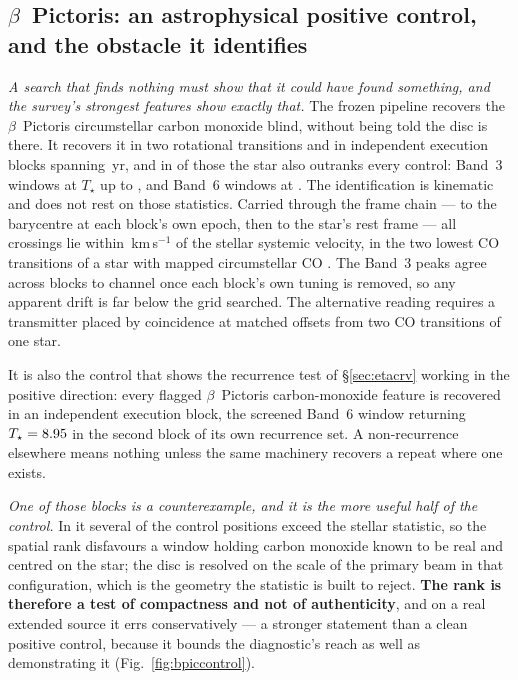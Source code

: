 \subsection{$\beta$~Pictoris: an astrophysical positive control, and the
obstacle it identifies} \label{sec:bpicval}

\emph{A search that finds nothing must show that it could have found
something, and the survey's strongest features show exactly that.} The
frozen pipeline recovers the $\beta$~Pictoris circumstellar carbon monoxide
blind, without being told the disc is there. It recovers it in two
rotational transitions and in \CsBpCoBlocks{} independent execution
blocks spanning \BpBaselineYr\,yr, and in \NStageOneBpicEb{} of those the
star also outranks every control: \BpicNFlagThree{} Band~3 windows at
$T_\star$ up to \BpicBThreeTsym, and \BpicNFlagSix{} Band~6 windows at
\BpicBSixTsym. The identification is kinematic and does not rest on those
statistics. Carried through the frame chain --- to the barycentre at each
block's own epoch, then to the star's rest frame --- all \BpicPanelNCo{}
crossings lie within \BpicDvCoHi\,km\,s$^{-1}$ of the stellar systemic
velocity, in the two lowest CO transitions of a star with mapped
circumstellar CO \citep{Dent2014,Matra2017}. The Band~3 peaks agree across blocks to
\BpRecThreeTuneChanMax{} channel once each block's own tuning is removed, so
any apparent drift is far below the grid searched. The alternative reading
requires a transmitter placed by coincidence at matched offsets from two CO
transitions of one star.

It is also the control that shows the recurrence test of
\S\ref{sec:etacrv} working in the positive direction: every flagged
$\beta$~Pictoris carbon-monoxide feature is recovered in an independent
execution block, the screened Band~6 window returning
$T_\star=8.95{}$ in the second block of its own recurrence set. A
non-recurrence elsewhere means nothing unless the same machinery recovers a
repeat where one exists.

\emph{One of those blocks is a counterexample, and it is the more useful half
of the control.} In it several of the \NCtrl{} control positions exceed the
stellar statistic, so the spatial rank disfavours a window holding carbon
monoxide known to be real and centred on the star; the disc is resolved on
the scale of the primary beam in that configuration, which is the geometry
the statistic is built to reject. \textbf{The rank is therefore a test of
compactness and not of authenticity}, and on a real extended source it errs
conservatively --- a stronger statement than a clean positive control, because
it bounds the diagnostic's reach as well as demonstrating it
(Fig.~\ref{fig:bpiccontrol}).

